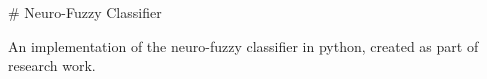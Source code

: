 # Neuro-Fuzzy Classifier

An implementation of the neuro-fuzzy classifier in python, created as part of research work.

